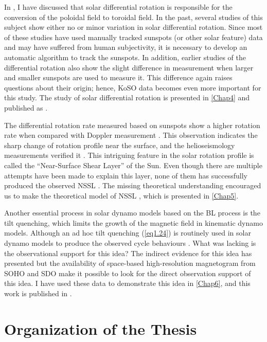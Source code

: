 In , I have discussed that solar differential rotation is responsible for the conversion of the poloidal field to toroidal field. In the past, several studies \citep[see review by][]{Beck2000} of this subject show either no or minor variation in solar differential rotation. Since most of these studies have used manually tracked sunspots (or other solar feature) data and may have suffered from human subjectivity, it is necessary to develop an automatic algorithm to track the sunspots. In addition, earlier studies of the differential rotation also show the slight difference in measurement when larger and smaller sunspots are used to measure it. This difference again raises questions about their origin; hence, KoSO data becomes even more important for this study. The study of solar differential rotation is presented in \autoref{Chap4} and published as \citet{Jha2021}. 


The differential rotation rate measured based on sunspots \citep{Jha2021} show a higher rotation rate when compared with Doppler measurement \citep{Howard1970}. This observation indicates the sharp change of rotation profile near the surface, and the helioseismology measurements verified it \citep{Schou1998, Howe2005}. This intriguing feature in the solar rotation profile is called the ``Near-Surface Shear Layer'' of the Sun. Even though there are multiple attempts have been made to explain this layer, none of them has successfully produced the observed NSSL \citep{Foukal1975, Gilman1979, Hotta2015}. The missing theoretical understanding encouraged us to make the theoretical model of NSSL \citep{Jha2021a}, which is presented in \autoref{Chap5}.


Another essential process in solar dynamo models based on the BL process is the tilt quenching, which limits the growth of the magnetic field in kinematic dynamo models. Although an ad hoc tilt quenching (\autoref{eq1.24}) is routinely used in solar dynamo models to produce the observed cycle behaviours \citep{Charbonneau2010, Karak2017, Karak2018}. What was lacking is the observational support for this idea? The indirect evidence for this idea has presented \citet{DasiEspuig2010} but the availability of space-based high-resolution magnetogram from SOHO and SDO make it possible to look for the direct observation support of this idea. I have used these data to demonstrate this idea in \autoref{Chap6}, and this work is published in \citet{Jha2020}. 


\section{Organization of the Thesis}

